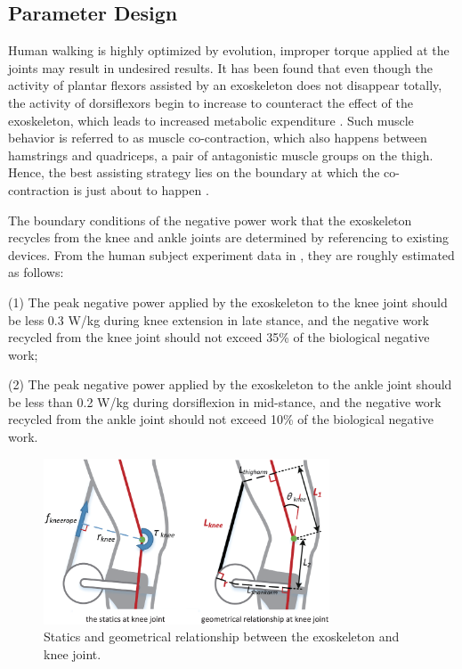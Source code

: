 \documentclass[twocolumn,cleanfoot,10pt]{asme2ej}
\begin{document}
\subsection{Parameter Design}

\label{sec:parameter design}


Human walking is highly optimized by evolution, improper torque applied at the joints may result in undesired results.  It has been found that even though the activity of plantar flexors assisted by an exoskeleton does not disappear totally, the activity of dorsiflexors begin to increase to counteract the effect of the exoskeleton, which leads to increased metabolic expenditure \cite{RN4}. Such muscle behavior is referred to as muscle co-contraction, which also happens between hamstrings and quadriceps, a pair of antagonistic muscle groups on the thigh. Hence, the best assisting strategy lies on the boundary at which the co-contraction is just about to happen \cite{RN22}. 

The boundary conditions of the negative power work that the exoskeleton recycles from the knee and ankle joints are determined by referencing to existing devices.
From the human subject experiment data in \cite{RN5,RN18}, they are roughly estimated as follows:

(1) The peak negative power applied by the exoskeleton to the knee joint should be less 0.3 W/kg during knee extension in late stance, and the negative work recycled from the knee joint should not exceed 35\% of the biological negative work;

(2) The peak negative power applied by the exoskeleton to the ankle joint should be less than 0.2 W/kg during dorsiflexion in mid-stance, and the negative work recycled from the ankle joint should not exceed 10\% of the biological negative work.

\begin{figure}[t]
	\centering
	\includegraphics[width=8.5cm]{kneeparameters.eps}
	\caption{Statics and geometrical relationship between the exoskeleton and knee joint.}
	\label{fig:kneeparameters}
\end{figure}
\end{document}
